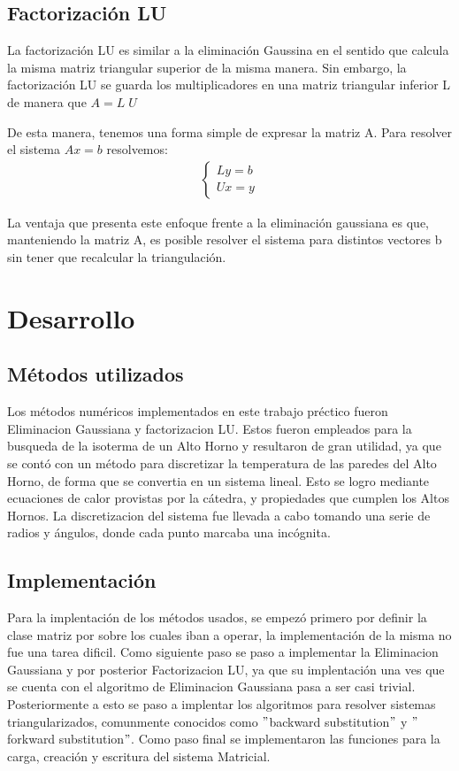 \documentclass[12pt,a4paper]{article}
\begin{document}
\subsection{Factorización LU}

La factorización LU es similar a la eliminación Gaussina en el sentido que calcula la misma matriz triangular superior de la misma manera. Sin embargo, la factorización LU se guarda los multiplicadores en una matriz triangular inferior L de manera que $A\! =\! L\; U$

De esta manera, tenemos una forma simple de expresar la matriz A. Para resolver el sistema $Ax \! = \! b $ resolvemos:
\begin{align*}
\begin{cases}
Ly = b \\
Ux = y 
\end{cases}
\end{align*}

La ventaja que presenta este enfoque frente a la eliminación gaussiana es que, manteniendo la matriz A, es posible resolver el sistema para distintos vectores b sin tener que recalcular la triangulación.

\section{Desarrollo}

\subsection{Métodos utilizados}

Los métodos numéricos implementados en este trabajo préctico fueron Eliminacion Gaussiana y factorizacion LU. Estos fueron empleados para la busqueda de la isoterma de un Alto Horno y resultaron de gran utilidad, ya que se contó con un método para discretizar la temperatura de las paredes del Alto Horno, de forma que se convertia en un sistema lineal. Esto se logro mediante ecuaciones de calor provistas por la cátedra, y propiedades que cumplen los Altos Hornos. La discretizacion del sistema fue llevada a cabo tomando una serie de radios y ángulos, donde cada punto marcaba una incógnita.

\subsection{Implementación}

Para la implentación de los métodos usados, se empezó primero por definir la clase matriz por sobre los cuales iban a operar, la implementación de la misma no fue una tarea dificil. Como siguiente paso se paso a implementar la Eliminacion Gaussiana y por posterior Factorizacion LU, ya que su implentación una ves que se cuenta con el algoritmo de Eliminacion Gaussiana pasa a ser casi trivial. Posteriormente a esto se paso a implentar los algoritmos para resolver sistemas triangularizados, comunmente conocidos como $"$backward substitution$"$ y $"$forkward substitution$"$.
Como paso final se implementaron las funciones para la carga, creación y escritura del sistema Matricial.
\end{document}
